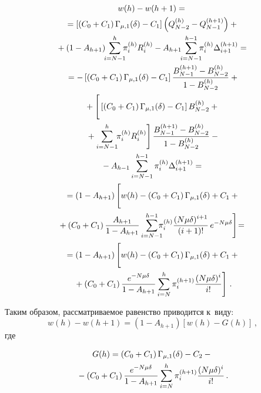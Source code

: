 \begin{multicols}{2}
\noindent
  \begin{multline*}
  w(h)-w(h+1)={}\\
  \!{}=\left[ \left( C_0+C_1\right) \Gamma_{\mu,1}(\delta) -C_1\right] 
\left( Q^{(h)}_{N-2}-Q_{N-1}^{(h+1)}\right)+{}\\
  {}+\left( 1-A_{h+1}\right) \!\!\sum\limits^h_{i=N-1}\!\!\! \pi_i^{(h)} R_i^{(h)} -A_{h+1}\!\! 
\sum\limits^{h-1}_{i=N-1} \!\!\!\pi_i^{(h)} \Delta_{i+1}^{(h+1)}={}\\
  {}=-\left[ \left( C_0+C_1\right) \Gamma_{\mu,1}(\delta) -C_1\right] 
\fr{B^{(h+1)}_{N-1}-B^{(h)}_{N-2}}{1-B^{(h)}_{N-2}}+{}\\
{}+
  \left[ \vphantom{\sum\limits^h_{i=N-1}}
   \left[\left( C_0+C_1\right) \Gamma_{\mu,1}(\delta) -C_1\right] 
  B^{(h)}_{N-2}+{}\right.\\
\left.  {}+\sum\limits^h_{i=N-1}\!\!\pi_i^{(h)} R_i^{(h)}\right]
\fr{B^{(h+1)}_{N-1}- B^{(h)}_{N-2}} {1-B^{(h)}_{N-2}} -{}\\
{}-
  A_{h-1}\sum\limits^{h-1}_{i=N-1}\pi_i^{(h)} \Delta^{(h+1)}_{i+1}={}\\
  {}=\left( 1-A_{h+1}\right) \left[ 
  \vphantom{\sum\limits^{h-1}_{i=N-1} \pi_i^{(h)} \fr{(N\mu\delta)^{i+1}}{(i+1)!}}
  w(h)-\left( C_0+C_1\right) 
\Gamma_{\mu,1}(\delta)+C_1+{}\right.\\
 \hspace*{-1.73294pt} \left.{}+ \left(C_0+C_1\right) \fr{A_{h+1}}{1-A_{h+1}} 
  \sum\limits^{h-1}_{i=N-1} \!\!\!\!\pi_i^{(h)} \fr{(N\mu\delta)^{i+1}}{(i+1)!}\, 
e^{-N\mu\delta}\right]\!={}
\\
  {}=
  \left( 1-A_{h+1}\right) \left[
  \vphantom{\sum\limits^h_{i=N} \pi_i^{(h+1)} \fr{(N\mu\delta)^i}{i!}}
   w(h)-\left( C_0+C_1\right)\Gamma_{\mu,1}(\delta)+C_1+{}\right.\\
  \left.{}+ \left(C_0+C_1\right) \fr{e^{-N\mu\delta}}{1-
A_{h+1}}\sum\limits^h_{i=N} \pi_i^{(h+1)} \fr{(N\mu\delta)^i}{i!}\right]\,.
  \end{multline*}
  
  Таким образом, рассматриваемое равенство приводится к~виду:
   \begin{equation}
  w(h)-w(h+1)=\left(1-A_{h+1}\right)[w(h)-G(h)]\,,
  \label{e5-ag}
  \end{equation}
где 

\noindent
\begin{multline*}
G(h)=\left( C_0+C_1\right) \Gamma_{\mu,1}(\delta) -C_2-{}\\
{}-\left( C_0+C_1\right) 
\displaystyle\frac{\displaystyle e^{-N\mu\delta}\mathstrut}{\displaystyle 1-A_{h+1}\mathstrut}\sum\limits^h_{i=N} 
\pi_i^{(h+1)}\displaystyle\frac{\displaystyle (N\mu\delta)^i\mathstrut}{\displaystyle i!\mathstrut}\,.
\end{multline*}
  

\end{multicols}
